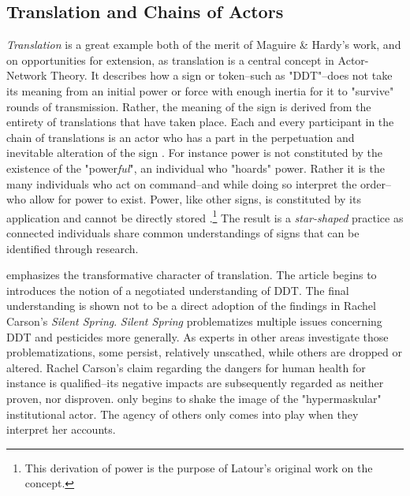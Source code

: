 
\subsection*{Translation and Chains of Actors}


\textit{Translation} is a great example both of the merit of Maguire \& Hardy's work, and on opportunities for extension, as translation is a central concept in Actor-Network Theory. It describes how a sign or token--such as "DDT"--does not take its meaning from an initial power or force with enough inertia for it to "survive" rounds of transmission. Rather, the meaning of the sign is derived from the entirety of translations that have taken place. Each and every participant in the chain of translations is an actor who has a part in the perpetuation and inevitable alteration of the sign \citep{Latour2005b}. For instance power is not constituted by the existence of the "power\textit{ful}", an individual who "hoards" power. Rather it is the many individuals who act on command--and while doing so interpret the order--who allow for power to exist. Power, like other signs, is constituted by its application and cannot be directly stored \citep{Latour1984}.\footnote{This derivation of power is the purpose of Latour's original work on the concept.} The result is a \textit{star-shaped} \citep[cf.][]{Nicolini2009} practice as connected individuals share common understandings of signs that can be identified through research.


\citet{Maguire2009} emphasizes the transformative character of translation. The article begins to introduces the notion of a negotiated understanding of DDT. The final understanding is shown not to be a direct adoption of the findings in Rachel Carson's \textit{Silent Spring}. \textit{Silent Spring} problematizes multiple issues concerning DDT and pesticides more generally. As experts in other areas investigate those problematizations, some persist, relatively unscathed, while others are dropped or altered. Rachel Carson's claim regarding the dangers for human health for instance is qualified--its negative impacts are subsequently regarded as neither proven, nor disproven. \citet{Maguire2009} only begins to shake the image of the "hypermaskular" \citep[cf.][]{Suddaby2017} institutional actor. The agency of others only comes into play when they interpret her accounts. 

